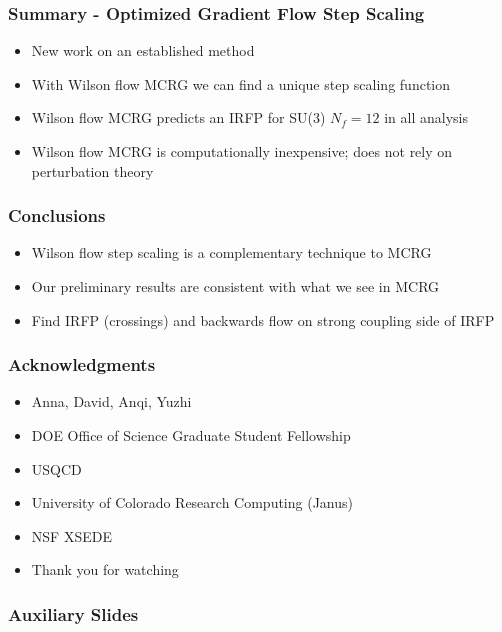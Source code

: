 \documentclass{beamer}
\begin{document}
  \begin{frame}
    \frametitle{Summary - Optimized Gradient Flow Step Scaling}
    \begin{itemize}
      \item New work on an established method
      \item With Wilson flow MCRG we can find a unique step scaling function
      \item Wilson flow MCRG predicts an IRFP for SU(3) $N_f=12$ in all analysis
      \item Wilson flow MCRG is computationally inexpensive; does not rely on perturbation theory
    \end{itemize}
  \end{frame}

  \begin{frame}
    \frametitle{Conclusions}
    \begin{itemize}
      \item Wilson flow step scaling is a complementary technique to MCRG
      \item Our preliminary results are consistent with what we see in MCRG
      \item Find IRFP (crossings) and backwards flow on strong coupling side of IRFP
    \end{itemize}
  \end{frame}

  \begin{frame}
    \frametitle{Acknowledgments}
    \begin{itemize}
      \item{Anna, David, Anqi, Yuzhi}
      \item{DOE Office of Science Graduate Student Fellowship}
      \item{USQCD}
      \item{University of Colorado Research Computing (Janus)}
      \item{NSF XSEDE}
      \item{Thank you for watching}
    \end{itemize}
  \end{frame}


  \begin{frame}
    \addtocounter{framenumber}{-1}
    \frametitle{Auxiliary Slides}
  \end{frame}
\end{document}
